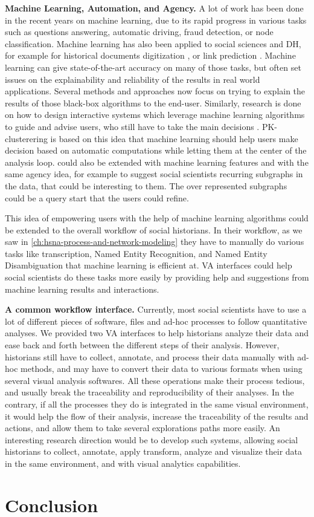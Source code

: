 \noindent\textbf{Machine Learning, Automation, and Agency.} A lot of work has been done in the recent years on machine learning, due to its rapid progress in various tasks such as questions answering, automatic driving, fraud detection, or node classification.
Machine learning has also been applied to social sciences and DH, for example for historical documents digitization \cite{philipsHistoricalDocumentProcessing2020}, or link prediction \cite{michalskiPredictingSocialNetwork2012}.
Machine learning can give state-of-the-art accuracy on many of those tasks, but often set issues on the explainability and reliability of the results in real world applications.
Several methods and approaches now focus on trying to explain the results of those black-box algorithms to the end-user.
Similarly, research is done on how to design interactive systems which leverage machine learning algorithms to guide and advise users, who still have to take the main decisions \cite{heerAgencyAutomationDesigning2019}.
PK-clusterering is based on this idea that machine learning should help users make decision based on automatic computations while letting them at the center of the analysis loop.
\name could also be extended with machine learning features and with the same agency idea, for example to suggest social scientists recurring subgraphs in the data, that could be interesting to them.
The over represented subgraphs could be a query start that the users could refine.

This idea of empowering users with the help of machine learning algorithms could be extended to the overall workflow of social historians.
In their workflow, as we saw in \autoref{ch:hsna-process-and-network-modeling} they have to manually do various tasks like transcription, Named Entity Recognition, and Named Entity Disambiguation that machine learning is efficient at.
VA interfaces could help social scientists do these tasks more easily by providing help and suggestions from  machine learning results and interactions.


\noindent\textbf{A common workflow interface.} Currently, most social scientists have to use a lot of different pieces of software, files and ad-hoc processes to follow quantitative analyses.
We provided two VA interfaces to help historians analyze their data and ease back and forth between the different steps of their analysis.
However, historians still have to collect, annotate, and process their data manually with ad-hoc methods, and may have to convert their data to various formats when using several visual analysis softwares.
All these operations make their process tedious, and usually break the traceability and reproducibility of their analyses.
In the contrary, if all the processes they do is integrated in the same visual environment, it would help the flow of their analysis, increase the traceability of the results and actions, and allow them to take several explorations paths more easily.
An interesting research direction would be to develop such systems, allowing social historians to collect, annotate, apply transform, analyze and visualize their data in the same environment, and with visual analytics capabilities.




\section{Conclusion}

